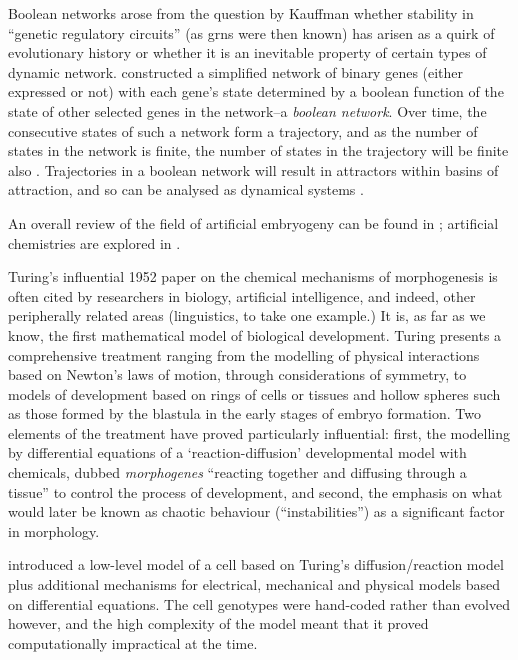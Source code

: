 Boolean networks arose from the question by Kauffman \cite{Kauffman:1969ne} whether stability in ``genetic
regulatory circuits'' (as \glspl{grn} were then known) has arisen as a quirk of evolutionary history or whether it is an
inevitable property of certain types of dynamic network. \cite{Kauffman:1969ne} constructed a simplified network of
binary genes (either expressed or not) with each gene's state determined by a boolean function of the state of other
selected genes in the network--a \emph{boolean network}. Over time, the consecutive states of such a network form a
trajectory, and as the number of states in the network is finite, the number of states in the trajectory will be finite
also \cite{De-Jong:2002jv}. Trajectories in a boolean network will result in attractors within basins of
attraction, and so can be analysed as dynamical systems \cite{Luque:1997qo,Kauffman:1969ne,Kauffman:1993kk}.

An overall review of the field of artificial embryogeny can be found in \cite{Stanley:2003fh}; artificial chemistries
are explored in \cite{Dittrich:2001zr}.

Turing's influential 1952 paper \parencite{Turing:1952qr} on the chemical mechanisms of \gls{morphogenesis} is often cited by researchers in biology, artificial intelligence, and indeed, other peripherally related areas (linguistics, to take one example.) It is, as far as we know, the first mathematical model of biological development. Turing presents a comprehensive treatment ranging from the modelling of physical interactions based on Newton's laws of motion, through considerations of symmetry, to models of development based on rings of cells or tissues and hollow spheres such as those formed by the blastula in the early stages of embryo formation. Two elements of the treatment have proved particularly influential: first, the modelling by differential equations of a `reaction-diffusion' developmental model with chemicals, dubbed \emph{morphogenes} ``reacting together and diffusing through a tissue'' \parencite{Turing:1952qr} to control the process of development, and second, the emphasis on what would later be known as chaotic behaviour (``instabilities'') as a significant factor in morphology.

\cite{Fleischer:1994kx} introduced a low-level model of a cell based on Turing's diffusion/reaction model
\parencite{Turing:1952qr} plus additional mechanisms for electrical, mechanical and physical models based on
differential equations. The cell genotypes were hand-coded rather than evolved however, and the high complexity of the
model meant that it proved computationally impractical at the time.

